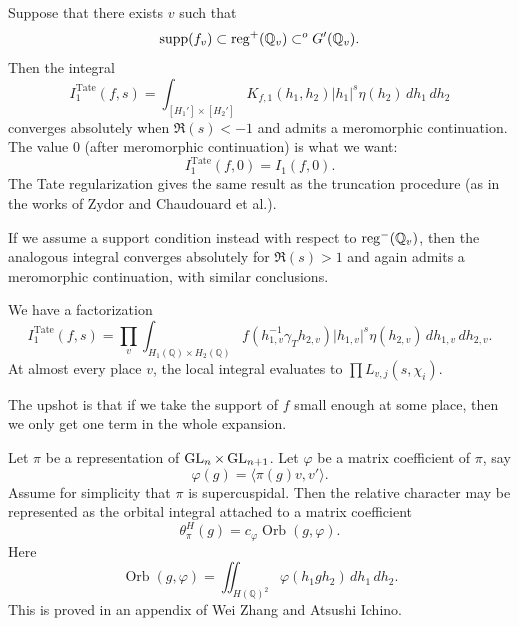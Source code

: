 \documentclass[reqno]{amsart} 
\begin{document}
Suppose that there exists $v$ such that
\begin{equation*}
  \operatorname{supp}(f_v) \subset \operatorname{reg}^+(\mathbb{Q}_v) \subset^o G '(\mathbb{Q}_v).
\end{equation*}
Then the integral
\begin{equation*}
  I_1^{\mathrm{Tate}}(f, s) = \int_{[H_1'] \times [H_2']}
  K_{f,1}(h_1, h_2) \lvert h_1 \rvert^s \eta(h_2) \, d h_1 \, d h_2
\end{equation*}
converges absolutely when $\Re(s) < -1$ and admits a meromorphic continuation.  The value $0$ (after meromorphic continuation) is what we want:
\begin{equation*}
  I_1^{\mathrm{Tate}}(f, 0) = I_1(f, 0).
\end{equation*}
The Tate regularization gives the same result as the truncation procedure (as in the works of Zydor and Chaudouard et al.).

If we assume a support condition instead with respect to $\operatorname{reg}^-(\mathbb{Q}_v)$, then the analogous integral converges absolutely for $\Re(s) > 1$ and again admits a meromorphic continuation, with similar conclusions.

We have a factorization
\begin{equation*}
  I_1^{\mathrm{Tate}}(f, s) = \prod_v \int_{H_1(\mathbb{Q} ) \times H_2(\mathbb{Q})} f(h_{1, v}^{-1} \gamma_T h_{2, v}) \lvert h_{1, v} \rvert^s \eta(h_{2, v}) \, d h_{1, v} \, d h_{2, v}.
\end{equation*}
At almost every place $v$, the local integral evaluates to $\prod L_{v , j}(s, \chi_i)$.

The upshot is that if we take the support of $f$ small enough at some place, then we only get one term in the whole expansion.

\begin{remark}
  Let $\pi$ be a representation of $\operatorname{GL}_n \times \operatorname{GL}_{n + 1}$.  Let $\varphi$ be a matrix coefficient of $\pi$, say
  \begin{equation*}
    \varphi(g) = \langle \pi(g) v, v' \rangle.
  \end{equation*}
  Assume for simplicity that $\pi$ is supercuspidal.  Then the relative character may be represented as the orbital integral attached to a matrix coefficient
  \begin{equation*}
    \theta_\pi^H(g) = c_\varphi \operatorname{Orb}(g, \varphi).
  \end{equation*}
  Here
  \begin{equation*}
    \operatorname{Orb}(g, \varphi) = \iint_{H(\mathbb{Q})^2} \varphi(h_1  g h_2) \, d h_1 \, d h_2.
  \end{equation*}
  This is proved in an appendix of Wei Zhang and Atsushi Ichino.
\end{remark}
\end{document}
